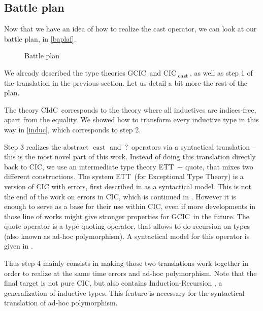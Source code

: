 \documentclass[en]{myarticle}
\renewcommand{\mathtt}{\mathrm}
\DeclareMathOperator{\?}{?}
\newcommand{\cas}{\operatorname{\mathtt{cast}}}
\newcommand{\quo}{\mathtt{quote}}
\newcommand{\gcic}{GCIC}
\newcommand{\cacic}{CIC\textsubscript{$\cas$}}
\newcommand{\cidc}{CIdC}
\newcommand{\ett}{ETT}
\newcommand{\eqcic}{\ett\ + $\quo$}
\begin{document}
{\subsection{Battle plan}
\label{baplas}

Now that we have an idea of how to realize the cast operator, we can look at our battle plan, in \autoref{baplaf}.
\begin{figure}[h]
	\centering
	\caption{Battle plan}
	\label{baplaf}
\end{figure}

We already described the type theories \gcic\ and \cacic, as well as step 1 of the translation in the previous section. Let us detail a bit more the rest of the plan.

The theory \cidc\ corresponds to the theory where all inductives are indices-free, apart from the equality. We showed how to transform every inductive type in this way in \autoref{induc}, which corresponds to step 2.

Step 3 realizes the abstract $\cas$ and $\?$ operators via a syntactical translation – this is the most novel part of this work. Instead of doing this translation directly back to CIC, we use an intermediate type theory \eqcic, that mixes two different constructions. The system \ett\ (for Exceptional Type Theory) is a version of CIC with errors, first described in \cite{Pedrot2018} as a syntactical model. This is not the end of the work on errors in CIC, which is continued in \cite{Pedrot2019}. However it is enough to serve as a base for their use within CIC, even if more developments in those line of works might give stronger properties for \gcic\ in the future. The $\quo$ operator is a type quoting operator, that allows to do recursion on types (also known as ad-hoc polymorphism). A syntactical model for this operator is given in \cite{Boulier2017}.

Thus step 4 mainly consists in making those two translations work together in order to realize at the same time errors and ad-hoc polymorphism. Note that the final target is not pure CIC, but also contains Induction-Recursion \cite{Dybjer2000}, a generalization of inductive types. This feature is necessary for the syntactical translation of ad-hoc polymorphism.

}
\end{document}
